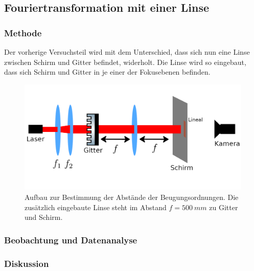 \documentclass[
	a4paper,
	12pt,
	pagesize,
	ngerman
]{scrartcl}
\begin{document}
	\subsection{Fouriertransformation mit einer Linse}

	\subsubsection*{Methode}

		Der vorherige Versuchsteil wird mit dem Unterschied, dass sich nun eine Linse zwischen Schirm und Gitter befindet, widerholt.
		Die Linse wird so eingebaut, dass sich Schirm und Gitter in je einer der Fokusebenen befinden.

	\begin{figure}[H]
			\includegraphics[width=1\linewidth]{img/gitterlinse}
			\caption{
				Aufbau zur Bestimmung der Abstände der Beugungsordnungen. Die zusätzlich eingebaute Linse steht im Abstand $f=\SI{500}{mm}$ zu Gitter und Schirm.
			}
			\label{fig_gitterlinse}
	\end{figure}

	\subsubsection*{Beobachtung und Datenanalyse}

	\subsubsection*{Diskussion}
\end{document}
